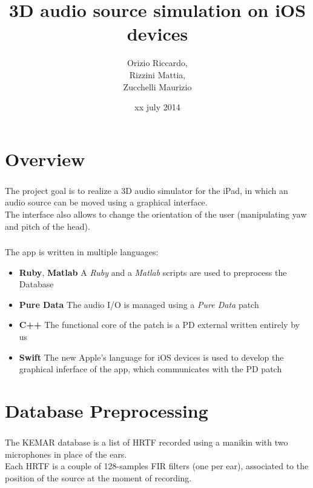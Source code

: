 \documentclass{beamer}
\title{3D audio source simulation on iOS devices}
\author[Orizio, Rizzini, Zucchelli]{Orizio Riccardo,\\Rizzini Mattia,\\Zucchelli Maurizio}
\date{xx july 2014}
\institute[UniBS]{University of Brescia}
\begin{document}
	\begin{frame}
		\maketitle
	\end{frame}

	\section{Overview}
	
	\begin{frame}
		\frametitle{\insertsection}
		The project goal is to realize a 3D audio simulator for the iPad, in
		which an audio source can be moved using a graphical interface.\\
		The interface also allows to change the orientation of the user (manipulating yaw
		and pitch of the head).\\
	\end{frame}

	\begin{frame}
		\frametitle{\insertsection}
		The app is written in multiple languages:
		\begin{itemize}
			\item {\bf Ruby}, {\bf Matlab} A {\em Ruby} and a {\em Matlab} scripts are used to 
			preprocess the Database
			\item {\bf Pure Data} The audio I/O is managed using a {\em Pure Data} patch
			\item {\bf C++} The functional core of the patch is a PD external written entirely
				by us
			\item {\bf Swift} The new Apple's language for iOS devices is used to develop the
				graphical inferface of the app, which communicates with the PD patch
		\end{itemize}
	\end{frame}

	\AtBeginSection[]
	{
		\begin{frame}
			\frametitle{Outline}
			\tableofcontents[currentsection]
		\end{frame}
	}

	\section{Database Preprocessing}

	\begin{frame}
		\frametitle{\insertsection}
		The KEMAR database is a list of HRTF recorded using a manikin with two
		microphones in place of the ears.\\
		Each HRTF is a couple of 128-samples FIR filters (one per ear), associated to the position
		of the source at the moment of recording.\\
	\end{frame}
\end{document}
